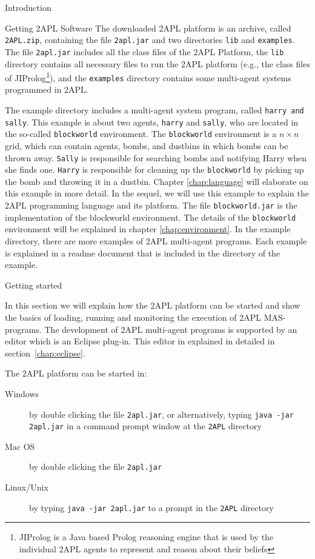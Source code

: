 \begin{chapter}{Introduction}
\begin{section}{Getting 2APL Software}
The downloaded 2APL platform is an archive, called {\tt 2APL.zip},
containing the file {\tt 2apl.jar} and two directories {\tt lib} and
{\tt examples}. The file {\tt 2apl.jar} includes all the class files
of the 2APL Platform, the {\tt lib} directory contains all necessary
files to run the 2APL platform (e.g., the class files of
JIProlog\footnote{JIProlog is a Java based Prolog reasoning engine
that is used by the individual 2APL agents to represent and reason
about their beliefs}), and the {\tt examples} directory contains
some multi-agent systems programmed in 2APL.

The example directory includes a multi-agent system program, called
{\tt harry and sally}. This example is about two agents, {\tt harry}
and {\tt sally}, who are located in the so-called {\tt blockworld}
environment. The {\tt blockworld} environment is a $n \times n$
grid, which can contain agents, bombs, and dustbins in which bombs
can be thrown away. {\tt Sally} is responsible for searching bombs
and notifying Harry when she finds one. {\tt Harry} is responsible
for cleaning up the {\tt blockworld} by picking up the bomb and
throwing it in a dustbin. Chapter \ref{chap:language} will elaborate
on this example in more detail. In the sequel, we will use this
example to explain the 2APL programming language and its platform.
The file {\tt blockworld.jar} is the implementation of the
blockworld environment. The details of the {\tt blockworld}
environment will be explained in chapter \ref{chap:environment}. In
the example directory, there are more examples of 2APL multi-agent
programs. Each example is explained in a readme document that is
included in the directory of the example.
\end{section}

\begin{section}{Getting started}

In this section we will explain how the 2APL platform can be started
and show the basics of loading, running and monitoring the execution
of 2APL MAS-programs. The development of 2APL multi-agent programs
is supported by an editor which is an Eclipse plug-in. This editor
in explained in detailed in section~\ref{chap:eclipse}.

The 2APL platform can be started in:
    \begin{description}
        \item[Windows] by double clicking the file {\tt 2apl.jar}, or
            alternatively, typing {\tt java -jar 2apl.jar} in a command prompt window at
            the {\tt 2APL} directory
        \item[Mac OS] by double clicking the file {\tt 2apl.jar}
        \item[Linux/Unix] by typing {\tt java -jar 2apl.jar} to a
            prompt in the {\tt 2APL} directory
    \end{description}


\end{section}
\end{chapter}
